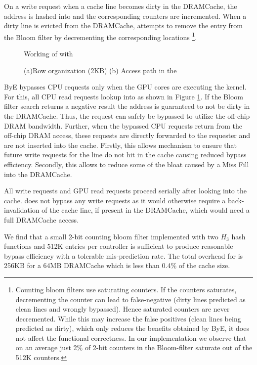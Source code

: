On a write request when a cache line becomes dirty in the DRAMCache, the address is hashed into \bypassname and the corresponding counters are incremented. When a dirty line is evicted from the DRAMCache, \bypassname attempts to remove the entry from the Bloom filter by decrementing the corresponding locations \footnote{Counting bloom filters use saturating counters. If the counters saturates, decrementing the counter can lead to false-negative (dirty lines predicted as clean lines and wrongly bypassed). Hence saturated counters are never decremented.  While this may increase the false positives (clean lines being predicted as dirty), which only reduces the benefits obtained by ByE, it does not affect the functional correctness. In our implementation we observe that on an average just 2\% of 2-bit counters in the Bloom-filter saturate out of the 512K counters.}.

\begin{figure}[htb]
    \centering
    \bloom
    \caption{Working of \cachename with \bypassname }
    \label{fig:bye}
\end{figure}


\begin{figure*}[!htb]
    \centering
    \chainaccess
    \caption{\cachename (a)Row organization (2KB) (b) Access path in the \cachename}
    \label{fig:chain-access}
\end{figure*}
ByE bypasses CPU requests only when the GPU cores are executing the kernel. For this, all CPU read requests lookup into \bypassname as shown in Figure \ref{fig:bye}. If the Bloom filter search returns a  negative result the address is guaranteed to not be dirty in the DRAMCache. Thus, the request can safely be bypassed to utilize the off-chip DRAM bandwidth. 
Further, when the bypassed CPU requests return from the off-chip DRAM access, these requests are directly forwarded to the requester and are not inserted into the cache. Firstly, this allows \bypassname mechanism to ensure that future write requests for the line do not hit in the cache causing reduced bypass efficiency. Secondly, this  allows \bypassname to reduce some of the bloat caused by a Miss Fill \cite{bear} into the DRAMCache.
\par All write requests and GPU read requests proceed serially after looking into the cache. \bypassname does not bypass any write requests as it would otherwise require a back-invalidation of the cache line, if present in the DRAMCache, which would need a full DRAMCache access.
\par We find that a small 2-bit counting bloom filter implemented with two $H_3$ hash functions \cite{h3} and 512K entries per controller is sufficient 
to produce reasonable bypass efficiency with a tolerable mis-prediction rate. The total overhead for \bypassname is 256KB for a 64MB DRAMCache which is less than 0.4\% of the cache size.




